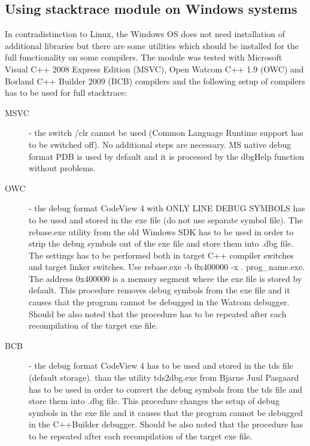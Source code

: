 \subsection {Using stacktrace module on Windows systems}
In contradistinction to Linux, the Windows OS does not need installation of additional libraries but there 
are some utilities which should be installed for the full functionality on some compilers.
The module was tested with Microsoft Visual C++ 2008 Express Edition (MSVC), Open Watcom C++ 1.9 (OWC) and 
Borland C++ Builder 2009 (BCB) compilers and the following setup of compilers has to be used for full stacktrace:
\begin {description}
\item [MSVC] - the switch {\sf /clr} cannot be used (Common Language Runtime support has to be switched off).
                   No additional steps are necessary. MS native debug format {\sf PDB} is used by default and
                   it is processed by the dbgHelp function without problems.

\item[OWC] - the debug format {\sf CodeView 4} with ONLY LINE DEBUG SYMBOLS has to be used and stored in the {\sf exe} 
                  file (do not use separate symbol file). The {\sf rebase.exe} utility from the old Windows SDK has to 
                  be used in order to strip the debug symbols out of the {\sf exe} file and store them 
                  into {\sf .dbg} file. The settings has to be performed both in target C++ compiler 
                  switches and target linker switches. Use {\sf rebase.exe -b 0x400000 -x . prog\_name.exe}. 
                  The address 0x400000 is a memory segment where the {\sf exe} file is stored by default. This 
                  procedure removes debug symbols from the {\sf exe} file and it causes that the program cannot 
                  be debugged in the Watcom debugger. Should be also noted that the procedure has to be repeated 
                  after each recompilation of the target {\sf exe} file. 

\item [BCB] - the debug format {\sf CodeView 4} has to be used and stored in the {\sf tds} file (default storage).
                  than the utility {\sf tds2dbg.exe} from Bjarne Juul Pasgaard has to be used in order to convert the debug 
                  symbols from the {\sf tds} file and store them into {\sf .dbg} file. This procedure changes the setup of debug 
                  symbols in the {\sf exe} file and it causes that the program cannot be debugged in the C++Builder debugger. 
                  Should be also noted that the procedure has to be repeated after each recompilation of the target {\sf exe} file. 
\end {description}
